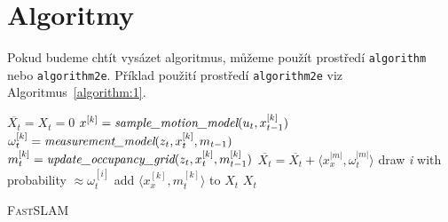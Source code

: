 \documentclass[11pt,a4paper]{article}
\begin{document}
\section{Algoritmy}
    \label{section:algoritmy}
    Pokud budeme chtít vysázet algoritmus, můžeme použít prostředí \texttt{algorithm}\footnotemark
    nebo \texttt{algorithm2e}\footnotemark.
    Příklad použití prostředí \texttt{algorithm2e} viz Algoritmus~\ref{algorithm:1}.\\


    \IncMargin{1.5em}
    \begin{algorithm}
        \label{algorithm:1}
        \DontPrintSemicolon
        \SetNlSty{}{}{:}
        \SetNlSkip{0.4em}
		\SetInd{1em}{1em}

		\Indm\Indmm
        \Indp\Indpp
        \BlankLine
        $ \overline{X_t} = X_t = 0$\;
        {
            $x^{[k]}=\emph{sample\_motion\_model}(u_t,x^{[k]}_{t-1})$\;
            $\omega^{[k]}_t=\emph{measurement\_model}(z_t,x^{[k]}_t,m_{t-1})$\;
            $m^{[k]}_t=\emph{update\_occupancy\_grid}(z_t,x^{[k]}_t,m^{[k]}_{t-1})$\;
            $\overline{X_t}=\overline{X_t}+\langle x^{|m|}_x,\omega^{|m|}_t\rangle$\;
        }
        {
            draw \emph{i} with probability $\approx \omega^{[i]}_t$\;
            add $\langle x^{[k]}_x,m^{[k]}_t \rangle$ to $X_t$\;
        }
        \KwRet${X_t}$
        \caption{\textsc{FastSLAM}}
    \end{algorithm}
    \DecMargin{1.5em}
\end{document}
